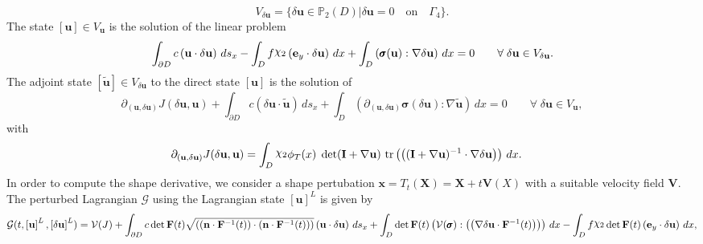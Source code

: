 \documentclass[preview]{standalone}
\let\oldcdot\cdot
\let\cdot\oldcdot
\begin{document}
\begin{equation*}
V_{{\delta\mathbf{  u }}} = \{ {\delta\mathbf{  u }} \in \mathbb P_{2}(D)| {\delta\mathbf{  u }} = 0  \quad \text{{on}} \quad\Gamma_{4} \}.\end{equation*}
The state $\left[ {\mathbf{ u }}\right] \in  V_{{\mathbf{ u }}}$ is the solution of the linear problem
\begin{dmath*}
 \int_{\partial D} c \left( {\mathbf{ u }} \cdot {\delta\mathbf{  u }} \right) \,ds_x -  \int_{D} f \raisebox{\depth}{$\chi_2$} \left( \mathbf e_y \cdot {\delta\mathbf{  u }} \right) \,dx +  \int_{D} \left( \pmb \sigma({\mathbf{ u }}) \mathrel{:}  \nabla {\delta\mathbf{  u }}  \right) \,dx = 0\qquad \forall\; {{\delta\mathbf{  u }}\in V_{{\delta\mathbf{  u }}}} . 
\end{dmath*}
The adjoint state $\left[ \tilde{\mathbf{ u }}\right] \in  V_{{\delta\mathbf{  u }}}$ to the direct state $\left[ {\mathbf{ u }}\right]$ is the solution of
\begin{dmath*}
\partial_{({\mathbf{ u }},{\delta\mathbf{  u }})} J({\delta\mathbf{  u }},{\mathbf{ u }}) +  \int_{\partial D} c \left( {\delta\mathbf{  u }} \cdot \tilde{\mathbf{ u }} \right) \,ds_x +  \int_{D} \left( \partial_{({\mathbf{ u }},{\delta\mathbf{  u }})} \pmb \sigma({\delta\mathbf{  u }}) \mathrel{:}  \nabla \tilde{\mathbf{ u }}  \right) \,dx = 0\qquad \forall\; {{\delta\mathbf{  u }}\in V_{{\mathbf{ u }}}} , 
\end{dmath*}
with 
\begin{align*}
\partial_{({\mathbf{ u }},{\delta\mathbf{  u }})} J({\delta\mathbf{  u }},{\mathbf{ u }}) &=  \int_{D} \raisebox{\depth}{$\chi_2$} \phi_{T}(x)  \;\operatorname{det}(\mathbf{I} +  \nabla {\mathbf{ u }} )   \,\operatorname{tr}\left(\left(  (\mathbf{I} +  \nabla {\mathbf{ u }} )^{-1}  \cdot  \nabla {\delta\mathbf{  u }}  \right)\right)  \,dx.
 \end{align*}
In order to compute the shape derivative, we consider a shape pertubation $\mathbf x = T_t(\mathbf X) = \mathbf X + t \mathbf  V(X)$ with a suitable velocity field $\mathbf V$. The perturbed Lagrangian $\mathcal G$ using the Lagrangian state $\left[ {\mathbf{ u }}\right]^{L}$ is given by
\begin{dmath*}
\mathcal G(t,\left[ {\mathbf{ u }}\right]^{L},\left[ {\delta\mathbf{  u }}\right]^{L}) = \mathcal V(J) +  \int_{\partial D} c  \operatorname{det}\mathbf F( t )  \sqrt{\left( \left( \mathbf n \cdot  \mathbf F^{-1}(t) \right) \cdot \left( \mathbf n \cdot  \mathbf F^{-1}(t) \right) \right)} \left( {\mathbf{ u }} \cdot {\delta\mathbf{  u }} \right) \,ds_x +  \int_{D}  \operatorname{det}\mathbf F( t )  \left( \mathcal V(\pmb \sigma) \mathrel{:} \left( \left(  \nabla {\delta\mathbf{  u }}  \cdot  \mathbf F^{-1}(t) \right) \right)\right) \,dx -  \int_{D} f \raisebox{\depth}{$\chi_2$}  \operatorname{det}\mathbf F( t )  \left( \mathbf e_y \cdot {\delta\mathbf{  u }} \right) \,dx , 
\end{dmath*}
\end{document}
